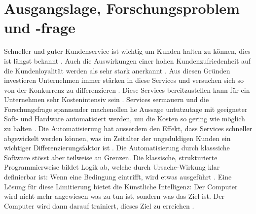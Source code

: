 \documentclass[12pt, twoside, table]{extarticle}
\begin{document}
\section{Ausgangslage, Forschungsproblem und -frage}



Schneller und guter Kundenservice ist wichtig um Kunden halten zu können, dies ist längst bekannt . Auch die Auswirkungen einer hohen Kundenzufriedenheit auf die Kundenloyalität werden als sehr stark anerkannt . Aus diesen Gründen investieren Unternehmen immer stärken in diese Services und versuchen sich so von der Konkurrenz zu differenzieren . Diese Services bereitzustellen kann für ein Unternehmen sehr Kostenintensiv sein .  Services sermauern und die Forschungsfrage spannender machenollen he Aussage untutzutage mit geeigneter Soft- und Hardware automatisiert werden, um die Kosten so gering wie möglich zu halten . Die Automatisierung hat ausserdem den Effekt, dass Services schneller abgewickelt werden können, was im Zeitalter der ungeduldigen Kunden ein wichtiger Differenzierungsfaktor ist . Die Automatisierung durch klasssiche Software stösst aber teilweise  an Grenzen. Die klassische, strukturierte Programmierweise bildet Logik ab, welche durch Ursache-Wirkung klar definierbar ist: Wenn eine Bedingung eintrifft, wird etwas ausgeführt . Eine Lösung für diese Limitierung bietet die Künstliche Intelligenz: Der Computer wird nicht mehr angewiesen was zu tun ist, sondern was das Ziel ist. Der Computer wird dann darauf trainiert, dieses Ziel zu erreichen .
\end{document}
